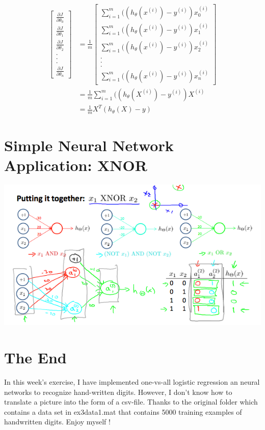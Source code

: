\documentclass[11pt]{article}
\begin{document}
		$$
		\begin{aligned}
		\left[
			\begin{array}{c}
				\frac{\partial J}{\partial \theta_{0}}  \\
				\frac{\partial J}{\partial \theta_{1}}  \\
				\frac{\partial J}{\partial \theta_{2}}  \\
				.  \\
				.  \\
				.  \\
				\frac{\partial J}{\partial \theta_{n}}  
			\end{array}
		\right] 
		&= \frac{1}{m} 
		\left[
			\begin{array}{c}
			 \sum_{i=1}^{m}((h_{\theta}(x^{(i)}) - y^{(i)})x_{0}^{(i)} \\
		     \sum_{i=1}^{m}((h_{\theta}(x^{(i)}) - y^{(i)})x_{1}^{(i)}  \\
		     \sum_{i=1}^{m}((h_{\theta}(x^{(i)}) - y^{(i)})x_{2}^{(i)}  \\
		     .  \\
		     .  \\
		     .  \\
			 \sum_{i=1}^{m}((h_{\theta}(x^{(i)}) - y^{(i)})x_{n}^{(i)}  
			\end{array}
		\right] \\
		&= \frac{1}{m} \sum_{i=1}^{m}((h_{\theta}(X^{(i)}) - y^{(i)})X^{(i)} \\
		&= \frac{1}{m} X^{T}(h_{\theta}(X) - y)
		\end{aligned}
		$$
		
	\section{Simple Neural Network Application: XNOR}
	
	\includegraphics[width = .8\textwidth]{XNOR.png}
	
	\section{The End} 
		In this week's exercise, I have implemented one-vs-all logistic regression an neural networks to recognize hand-written digits. However, I don't know how to translate a picture into the form of a csv-file. Thanks to the original folder which contains a data set in ex3data1.mat that contains 5000 training examples of handwritten digits. Enjoy myself !
\end{document}
